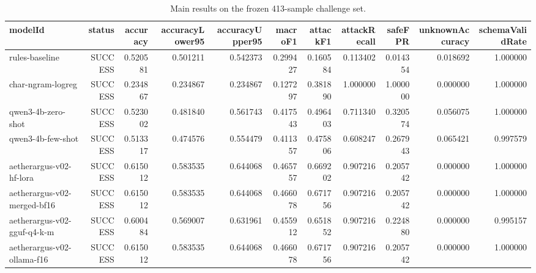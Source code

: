 \begin{table}[t]
\centering
\caption{Main results on the frozen 413-sample challenge set.}
\begin{tabular}{lrrrrrrrrrr}
\toprule
modelId & status & accuracy & accuracyLower95 & accuracyUpper95 & macroF1 & attackF1 & attackRecall & safeFPR & unknownAccuracy & schemaValidRate \\
\midrule
rules-baseline & SUCCESS & 0.520581 & 0.501211 & 0.542373 & 0.299427 & 0.160584 & 0.113402 & 0.014354 & 0.018692 & 1.000000 \\
char-ngram-logreg & SUCCESS & 0.234867 & 0.234867 & 0.234867 & 0.127297 & 0.381890 & 1.000000 & 1.000000 & 0.000000 & 1.000000 \\
qwen3-4b-zero-shot & SUCCESS & 0.523002 & 0.481840 & 0.561743 & 0.417543 & 0.496403 & 0.711340 & 0.320574 & 0.056075 & 1.000000 \\
qwen3-4b-few-shot & SUCCESS & 0.513317 & 0.474576 & 0.554479 & 0.411357 & 0.475806 & 0.608247 & 0.267943 & 0.065421 & 0.997579 \\
aetherargus-v02-hf-lora & SUCCESS & 0.615012 & 0.583535 & 0.644068 & 0.465757 & 0.669202 & 0.907216 & 0.205742 & 0.000000 & 1.000000 \\
aetherargus-v02-merged-bf16 & SUCCESS & 0.615012 & 0.583535 & 0.644068 & 0.466078 & 0.671756 & 0.907216 & 0.205742 & 0.000000 & 1.000000 \\
aetherargus-v02-gguf-q4-k-m & SUCCESS & 0.600484 & 0.569007 & 0.631961 & 0.455912 & 0.651852 & 0.907216 & 0.224880 & 0.000000 & 0.995157 \\
aetherargus-v02-ollama-f16 & SUCCESS & 0.615012 & 0.583535 & 0.644068 & 0.466078 & 0.671756 & 0.907216 & 0.205742 & 0.000000 & 1.000000 \\
\bottomrule
\end{tabular}
\end{table}
